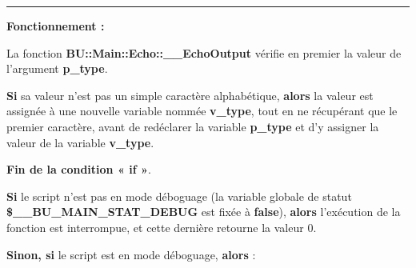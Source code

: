 \documentclass[a4paper,10pt]{article}
\begin{document}
\setlength{\parskip}{2em}


\par\noindent\rule{\textwidth}{0.4pt}\setlength{\parskip}{1em}

\begin{justify}
    \textbf{Fonctionnement :}

    La fonction \textbf{\color{func}BU::Main::Echo::\_\_EchoOutput} vérifie en premier la valeur de l'argument \textbf{\color{vars}p\_type}.
\end{justify}

\begin{justify}
    \textbf{\color{cond}Si} sa valeur n'est pas un simple caractère alphabétique, \textbf{\color{cond}alors} la valeur est assignée à une nouvelle variable nommée \textbf{\color{vars}v\_type}, tout en ne récupérant que le premier caractère, avant de redéclarer la variable \textbf{\color{vars}p\_type} et d'y assigner la valeur de la variable \textbf{\color{vars}v\_type}.
\end{justify}

\begin{justify}
    \textbf{\color{cond}Fin de la condition « if »}.
\end{justify}

\setlength{\parskip}{2em}


\begin{justify}
    \textbf{\color{cond}Si} le script n'est pas en mode déboguage (la variable globale de statut \textbf{\color{vars}\$\_\_BU\_MAIN\_STAT\_DEBUG} est fixée à \textbf{false}), \textbf{\color{cond}alors} l'exécution de la fonction est interrompue, et cette dernière retourne la valeur 0.
\end{justify}

\setlength{\parskip}{1em}

\begin{justify}
    \textbf{\color{cond}Sinon, si} le script est en mode déboguage, \textbf{\color{cond}alors} :
\end{justify}
\end{document}
